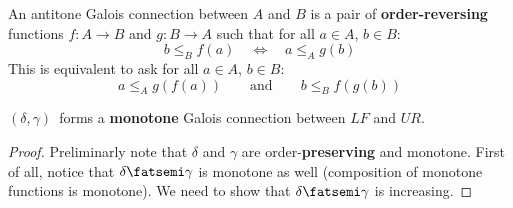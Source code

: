 \begin{definition}
An antitone Galois connection between $A$ and $B$ is a pair of \textbf{order-reversing} functions $f:A\to B$ and $g:B\to A$ such that for all $a\in A$, $b\in B$:
\begin{equation}
    b \leq_B f(a) \quad \Leftrightarrow \quad a \leq_A g(b) 
\end{equation}
This is equivalent to ask for all $a\in A$, $b\in B$:
\begin{equation}
a \leq_A g(f(a))   \qquad \text{and} \qquad  b \leq_B f(g(b))
\end{equation}
\end{definition}


\begin{lemma} $(\delta, \gamma)$~forms a \textbf{monotone} Galois connection between $LF$ and $UR$.
\end{lemma}
\begin{proof}

Preliminarly note that $\delta$ and $\gamma$ are order-\textbf{preserving} and monotone. First of all, notice that $\delta \then \gamma$ is monotone as well (composition of monotone functions is monotone). We need to show that $\delta \then \gamma$ is increasing. 

\end{proof}

